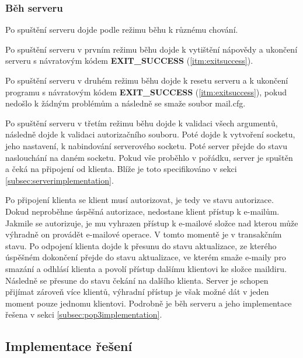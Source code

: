\documentclass[11pt,a4paper]{report}
\begin{document}
    \subsubsection{Běh serveru}
    Po spuštění serveru dojde podle režimu běhu k různému chování.\\ \par
    Po spuštění serveru v prvním režimu běhu dojde k vytištění nápovědy a ukončení serveru s návratovým kódem \textbf{EXIT\_SUCCESS} (\ref{itm:exitsuccess}). \par
    Po spuštění serveru v druhém režimu běhu dojde k resetu serveru a k ukončení programu s návratovým kódem \textbf{EXIT\_SUCCESS} (\ref{itm:exitsuccess}), pokud nedošlo k žádným problémům a následně se smaže soubor mail.cfg.\par
    Po spuštění serveru v třetím režimu běhu dojde k validaci všech argumentů, následně dojde k validaci autorizačního souboru. Poté dojde k vytvoření socketu, jeho nastavení, k nabindování serverového socketu. Poté server přejde do stavu naslouchání na daném socketu. Pokud vše proběhlo v pořádku, server je spuštěn a čeká na připojení od klienta. Blíže je toto specifikováno v sekci \ref{subsec:serverimplementation}.\par
    Po připojení klienta se klient musí autorizovat, je tedy ve stavu autorizace. Dokud neproběhne úspěšná autorizace, nedostane klient přístup k e-mailům. Jakmile se autorizuje, je mu vyhrazen přístup k e-mailové složce nad kterou může výhradně on provádět e-mailové operace. V tomto momentě je v transakčním stavu. Po odpojení klienta dojde k přesunu do stavu aktualizace, ze kterého úspěšném dokončení přejde do stavu aktualizace, ve kterém smaže e-maily pro smazání a odhlásí klienta a povolí přístup dalšímu klientovi ke složce maildiru. Následně se přesune do stavu čekání na dalšího klienta. Server je schopen přijímat zároveň více klientů, výhradní přístup je však možné dát v jeden moment pouze jednomu klientovi. Podrobně je běh serveru a jeho implementace řešena v sekci \ref{subsec:pop3implementation}.

    \clearpage
    \subsection{Implementace řešení}
\end{document}
